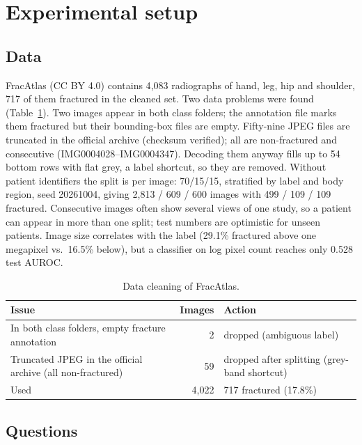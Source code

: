 \documentclass[11pt]{article}
\begin{document}
\section{Experimental setup}
\label{sec:setup}

\subsection{Data}
\label{sec:data}

FracAtlas \citep{abedeen2023fracatlas} (CC BY 4.0) contains 4{,}083 radiographs of hand, leg, hip and shoulder,
717 of them fractured in the cleaned set. Two data problems were found (Table~\ref{tab:cleaning}). Two images appear
in both class folders; the annotation file marks them fractured but their bounding-box files are empty. Fifty-nine
JPEG files are truncated in the official archive (checksum verified); all are non-fractured and consecutive
(IMG0004028--IMG0004347). Decoding them anyway fills up to 54 bottom rows with flat grey, a label shortcut, so they
are removed. Without patient identifiers the split is per image: 70/15/15, stratified by label and body region,
seed 20261004, giving 2{,}813 / 609 / 600 images with 499 / 109 / 109 fractured. Consecutive images often show
several views of one study, so a patient can appear in more than one split; test numbers are optimistic for unseen
patients. Image size correlates with the label (29.1\% fractured above one megapixel vs.\ 16.5\% below), but a
classifier on log pixel count reaches only 0.528 test AUROC.

\begin{table}[t]
  \centering\small
  \caption{Data cleaning of FracAtlas.}
  \label{tab:cleaning}
  \begin{tabular}{p{7.2cm}rp{5.2cm}}
    \toprule
    Issue & Images & Action \\
    \midrule
    In both class folders, empty fracture annotation & 2 & dropped (ambiguous label) \\
    Truncated JPEG in the official archive (all non-fractured) & 59 & dropped after splitting (grey-band shortcut) \\
    \midrule
    Used & 4{,}022 & 717 fractured (17.8\%) \\
    \bottomrule
  \end{tabular}
\end{table}

\subsection{Questions}
\end{document}
